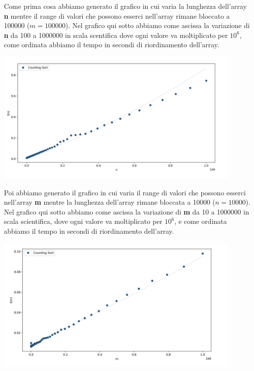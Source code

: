 \documentclass[a4paper, 12pt, oneside]{book}
\begin{document}
Come prima cosa abbiamo generato il grafico in cui varia la lunghezza dell'array \textbf{n} mentre il range di valori che possono esserci nell'array rimane bloccato a 100000 (\(m=100000\)). Nel grafico qui sotto abbiamo come ascissa la variazione di \textbf{n} da 100 a 1000000 in scala scentifica dove ogni valore va moltiplicato per \(10^6\), come ordinata abbiamo il tempo in secondi di riordinamento dell'array.

\begin{center}
    \includegraphics[width=0.9\textwidth]{images/grafico_counting_sort_n.png}
\end{center}    

\noindent Poi abbiamo generato il grafico in cui varia il range di valori che possono esserci nell'array \textbf{m} mentre la lunghezza dell'array rimane bloccata a 10000 (\(n=10000\)). Nel grafico qui sotto abbiamo come ascissa la variazione di \textbf{m} da 10 a 1000000 in scala scientifica, dove ogni valore va moltiplicato per \(10^6\), e come ordinata abbiamo il tempo in secondi di riordinamento dell'array.

\begin{center}
    \includegraphics[width=0.9\textwidth]{images/grafico_counting_sort_m.png}
\end{center}
\end{document}
